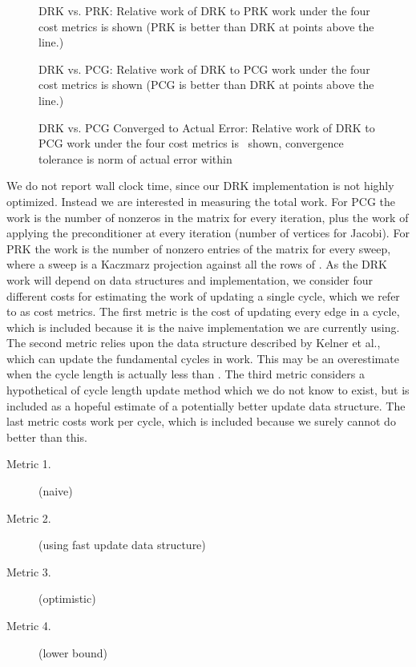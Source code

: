 \documentclass{sig-alternate}
\begin{document}
\begin{figure*}[htb!]
\centering
{}
\caption{DRK vs. PRK: Relative work of DRK to PRK work under the four cost
metrics is shown (PRK is better than DRK at points above the line.)\label{fig:prkworkcompare}}
\end{figure*}

\begin{figure*}[htb!]
\centering
{}
\caption{DRK vs. PCG: Relative work of DRK to PCG work under the four cost metrics
is shown
(PCG is better than DRK at points above the line.)\label{fig:pcgworkcompare}}
\end{figure*}

\begin{figure*}[htb!]
\centering
{}
\caption{DRK vs. PCG Converged to Actual Error: Relative work of DRK to PCG work under the four cost metrics is \
shown, convergence tolerance is norm of actual error within \label{fig:pcgactualerr}}
\end{figure*}


We do not report
wall clock time, since our DRK implementation is not highly optimized.
Instead we are interested in measuring the total work. For PCG the work is
the number of nonzeros in the matrix for every iteration, plus the work
of applying the preconditioner at every iteration
(number of vertices for Jacobi).
For PRK the work is the number of nonzero
entries of the matrix for every sweep,
where a sweep is a Kaczmarz projection against all the rows of .
As the DRK work will depend on data structures and implementation,
we consider four different costs for estimating the work
of updating a single cycle, which we refer to as cost metrics.
The first metric is the cost of updating
every edge in a cycle, which is included
because it is the naive implementation
we are currently using. The second metric relies upon
the data structure described by Kelner et al., which can
update the fundamental cycles
in  work.
This may be an overestimate when the cycle length is actually less than
.
The third metric considers a
hypothetical  of cycle length update method
which we do not know to exist, but is included as a hopeful
estimate of a potentially better update data structure.
The last metric costs  work per cycle, which is
included because we surely cannot do better than this.
\begin{description}
\item[Metric 1.]  (naive)
\item[Metric 2.]  (using fast update data structure)
\item[Metric 3.]  (optimistic)
\item[Metric 4.]  (lower bound)
\end{description}
\end{document}
